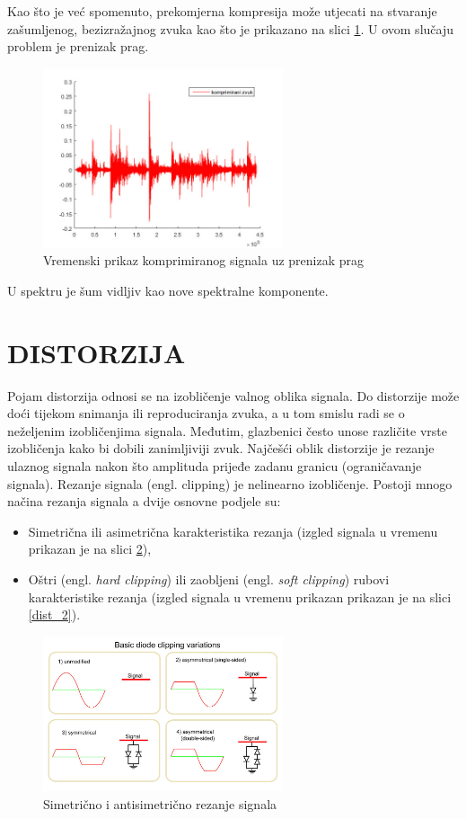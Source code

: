 \documentclass[conference]{IEEEtran}
\begin{document}
Kao što je već spomenuto, prekomjerna kompresija može utjecati na stvaranje zašumljenog, bezizražajnog
zvuka kao što je prikazano na slici \ref{komp_sum}. U ovom slučaju problem je prenizak prag.

\begin{figure}[H]
    \includegraphics[width=200pt]{slike/prenizak_prag.jpg}
    \centering
    \caption{Vremenski prikaz komprimiranog signala uz prenizak prag}
    \label{komp_sum}
\end{figure}

U spektru je šum vidljiv kao nove spektralne komponente.

\section{DISTORZIJA}

Pojam distorzija odnosi se na izobličenje valnog oblika signala. Do distorzije može doći tijekom snimanja
ili reproduciranja zvuka, a u tom smislu radi se o neželjenim izobličenjima signala. Međutim, glazbenici
često unose različite vrste izobličenja kako bi dobili zanimljiviji zvuk. Najčešći oblik distorzije je
rezanje ulaznog signala nakon što amplituda prijeđe zadanu granicu (ograničavanje signala).
Rezanje signala (engl. clipping) je nelinearno izobličenje. Postoji mnogo načina rezanja signala a dvije
osnovne podjele su:

\begin{itemize}
  \item{Simetrična ili asimetrična karakteristika rezanja (izgled signala u vremenu prikazan je na slici
    \ref{dist_1})},
  \item{Oštri (engl. \textit{hard clipping}) ili zaobljeni (engl. \textit{soft clipping}) rubovi karakteristike
  rezanja (izgled signala u vremenu prikazan prikazan je na slici \ref{dist_2})}.
\end{itemize}

\begin{figure}[H]
    \includegraphics[width=200pt]{slike/dist_diode_clip.jpg}
    \centering
    \caption{Simetrično i antisimetrično rezanje signala}
    \label{dist_1}
\end{figure}
\end{document}
